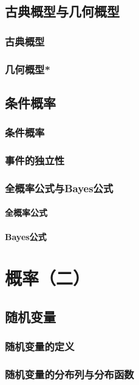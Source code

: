\section{古典概型与几何概型}
\subsection{古典概型}
\clearpage
\subsection{几何概型*}
\clearpage

\section{条件概率}
\subsection{条件概率}
\clearpage
\subsection{事件的独立性}
\clearpage
\subsection{全概率公式与Bayes公式}
\subsubsection{全概率公式}
\clearpage
\subsubsection{Bayes公式}
\clearpage


\chapter{概率（二）}
\section{随机变量}
\subsection{随机变量的定义}
\clearpage
\subsection{随机变量的分布列与分布函数}
\clearpage


